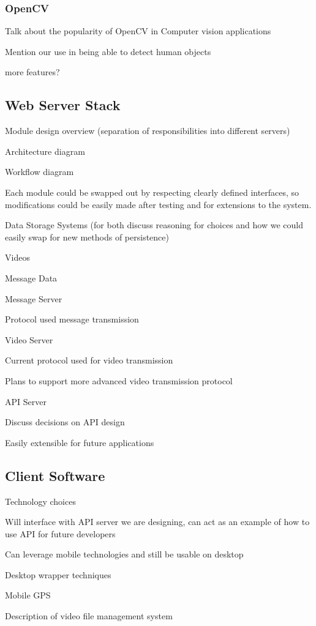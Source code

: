 \documentclass[10pt,conference]{IEEEtran}
\begin{document}
		\subsubsection{OpenCV}

Talk about the popularity of OpenCV in Computer vision applications

Mention our use in being able to detect human objects

more features?
	\subsection{Web Server Stack}
Module design overview (separation of responsibilities into different servers)

Architecture diagram

Workflow diagram

Each module could be swapped out by respecting clearly defined interfaces, so modifications could be easily made after testing and for extensions to the system.

Data Storage Systems (for both discuss reasoning for choices and how we could easily swap for new methods of persistence)

Videos

Message Data

Message Server

Protocol used message transmission

Video Server

Current protocol used for video transmission

Plans to support more advanced video transmission protocol

API Server

Discuss decisions on API design

Easily extensible for future applications

	\subsection{Client Software}
    
Technology choices

Will interface with API server we are designing, can act as an example of how to use API for future developers

Can leverage mobile technologies and still be usable on desktop

Desktop wrapper techniques

Mobile GPS

Description of video file management system
\end{document}
